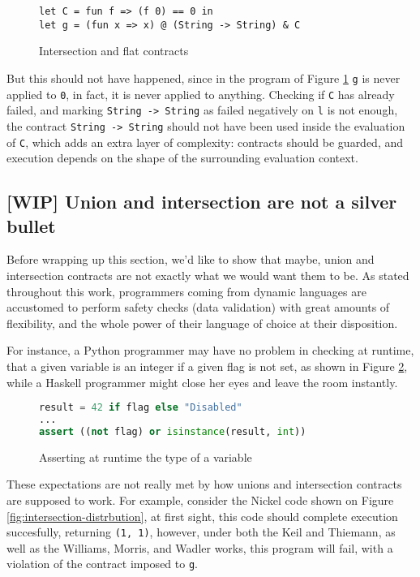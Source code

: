 \documentclass[sigplan,10pt,review,anonymous]{acmart}
\newcommand{\nickel}[1]{\lstinline[language=nickel]{#1}}
\begin{document}
\begin{figure}[h]
\begin{lstlisting}[language=nickel]
let C = fun f => (f 0) == 0 in
let g = (fun x => x) @ (String -> String) & C
\end{lstlisting}
\caption{Intersection and flat contracts}
\label{fig:inter-flat-contracts}
\end{figure}

But this should not have happened, since in the program of Figure \ref{fig:inter-flat-contracts}
\nickel{g} is never applied to \nickel{0}, in fact, it is never applied
to anything.
Checking if \nickel{C} has already failed, and marking \nickel{String -> String} as
failed negatively on \nickel{l} is not enough, the contract \nickel{String -> String}
should not have been used inside the evaluation of \nickel{C}, which
adds an extra layer of complexity: contracts should be guarded, and execution
depends on the shape of the surrounding evaluation context.

\subsection*{[WIP] Union and intersection are not a silver bullet}

Before wrapping up this section, we'd like to show that maybe, union and intersection
contracts are not exactly what we would want them to be.
As stated throughout this work, programmers coming from dynamic languages
are accustomed to perform safety checks (data validation) with
great amounts of flexibility, and the whole power of their
language of choice at their disposition.

For instance, a Python programmer may have no problem in checking
at runtime, that a given variable is an integer if a given flag is
not set, as shown in Figure \ref{fig:python-assertion},
while a Haskell programmer might close her eyes and leave the room
instantly.

\begin{figure}[h]
\begin{lstlisting}[language=python]
result = 42 if flag else "Disabled"
...
assert ((not flag) or isinstance(result, int))
\end{lstlisting}
\caption{Asserting at runtime the type of a variable}
\label{fig:python-assertion}
\end{figure}

These expectations are not really met by how unions and intersection
contracts are supposed to work.
For example, consider the Nickel code shown on Figure
\ref{fig:intersection-distrbution}, at first sight, this code should
complete execution succesfully, returning \nickel{(1, 1)},
however, under both the Keil and Thiemann, as well as the
Williams, Morris, and Wadler works, this program will fail, with a violation
of the contract imposed to \nickel{g}.
\end{document}
